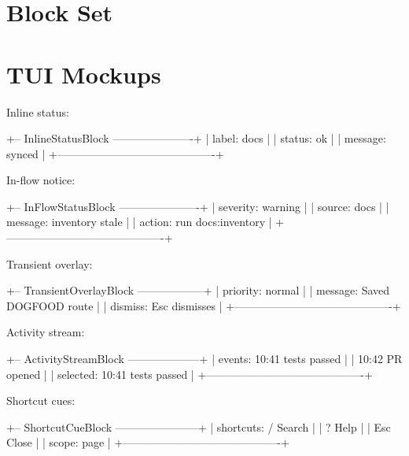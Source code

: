 \section{Block Set}\label{record-092-block-set}



\section{TUI Mockups}\label{record-092-tui-mockups}

Inline status:

\begin{CodeBlock}
+-- InlineStatusBlock ----------------------+
| label: docs                               |
| status: ok                                |
| message: synced                           |
+-------------------------------------------+
\end{CodeBlock}

In-flow notice:

\begin{CodeBlock}
+-- InFlowStatusBlock ----------------------+
| severity: warning                         |
| source: docs                              |
| message: inventory stale                  |
| action: run docs:inventory                |
+-------------------------------------------+
\end{CodeBlock}

Transient overlay:

\begin{CodeBlock}
+-- TransientOverlayBlock ------------------+
| priority: normal                          |
| message: Saved DOGFOOD route              |
| dismiss: Esc dismisses                    |
+-------------------------------------------+
\end{CodeBlock}

Activity stream:

\begin{CodeBlock}
+-- ActivityStreamBlock --------------------+
| events: 10:41 tests passed                |
|         10:42 PR opened                   |
| selected: 10:41 tests passed              |
+-------------------------------------------+
\end{CodeBlock}

Shortcut cues:

\begin{CodeBlock}
+-- ShortcutCueBlock -----------------------+
| shortcuts: / Search                       |
|            ? Help                         |
|            Esc Close                      |
| scope: page                               |
+-------------------------------------------+
\end{CodeBlock}

